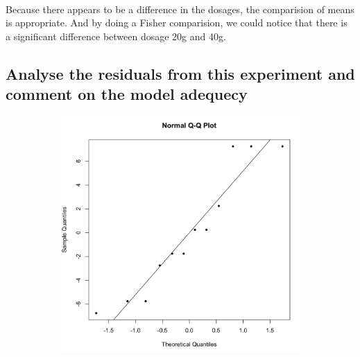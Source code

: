 \documentclass[11pt]{article}
\begin{document}
\paragraph{}
Because there appears to be a difference in the dosages, the comparision of means is appropriate.
And by doing a Fisher comparision, we could notice that there is a significant
difference between dosage 20g and 40g.

\subsection{Analyse the residuals from this experiment and comment on the model adequecy}

\begin{figure}[H]
    \centering
    \begin{subfigure}{0.45\textwidth}
        \includegraphics[width=\textwidth]{../pictures/hw2_q2_qq.png}
    \end{subfigure}
    \begin{subfigure}{0.45\textwidth}

\end{subfigure}
\end{figure}
\end{document}
